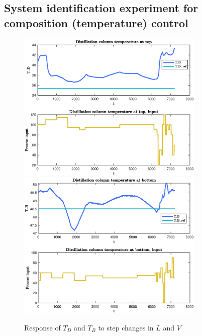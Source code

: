 \documentclass[12pt]{article}
\begin{document}
\subsection{System identification experiment for composition (temperature) control}
\begin{figure}[p]
\centering
\includegraphics[width=0.8\textwidth]{../Systemanalyse/Log_Data_to_Matlab/Figurer/LV_identifisering/T_D_eksperiment.eps}
\includegraphics[width=0.8\textwidth]{../Systemanalyse/Log_Data_to_Matlab/Figurer/LV_identifisering/T_B_eksperiment.eps}
\caption{Response of $T_D$ and $T_B $ to step changes in $L$ and $V$}
\label{fig:LV_experiment}
\end{figure}
\end{document}
